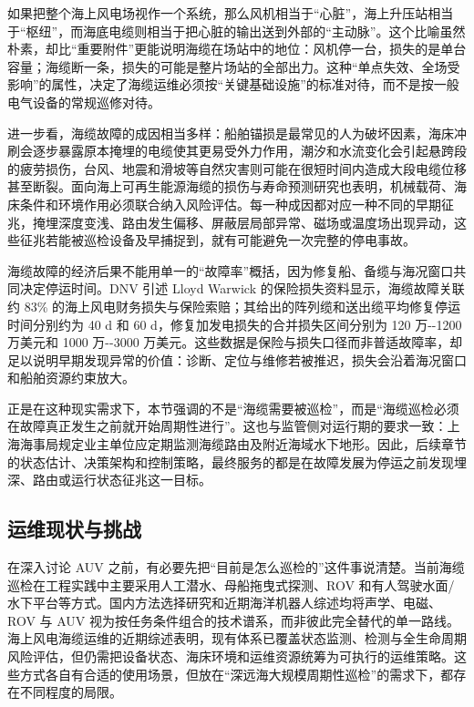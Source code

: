 如果把整个海上风电场视作一个系统，那么风机相当于``心脏''，海上升压站相当于``枢纽''，而海底电缆则相当于把心脏的输出送到外部的``主动脉''。这个比喻虽然朴素，却比``重要附件''更能说明海缆在场站中的地位：风机停一台，损失的是单台容量；海缆断一条，损失的可能是整片场站的全部出力。这种``单点失效、全场受影响''的属性，决定了海缆运维必须按``关键基础设施''的标准对待，而不是按一般电气设备的常规巡修对待。

进一步看，海缆故障的成因相当多样：船舶锚损是最常见的人为破坏因素，海床冲刷会逐步暴露原本掩埋的电缆使其更易受外力作用，潮汐和水流变化会引起悬跨段的疲劳损伤，台风、地震和滑坡等自然灾害则可能在很短时间内造成大段电缆位移甚至断裂。面向海上可再生能源海缆的损伤与寿命预测研究也表明，机械载荷、海床条件和环境作用必须联合纳入风险评估\cite{dinmohammadi2019predicting}。每一种成因都对应一种不同的早期征兆，掩埋深度变浅、路由发生偏移、屏蔽层局部异常、磁场或温度场出现异动，这些征兆若能被巡检设备及早捕捉到，就有可能避免一次完整的停电事故。

海缆故障的经济后果不能用单一的``故障率''概括，因为修复船、备缆与海况窗口共同决定停运时间。DNV 引述 Lloyd Warwick 的保险损失资料显示，海缆故障关联约 83\% 的海上风电财务损失与保险索赔；其给出的阵列缆和送出缆平均修复停运时间分别约为 40 d 和 60 d，修复加发电损失的合并损失区间分别为 120 万-\/-1200 万美元和 1000 万-\/-3000 万美元\cite{dnv2024cablefailure}。这些数据是保险与损失口径而非普适故障率，却足以说明早期发现异常的价值：诊断、定位与维修若被推迟，损失会沿着海况窗口和船舶资源约束放大。

正是在这种现实需求下，本节强调的不是``海缆需要被巡检''，而是``海缆巡检必须在故障真正发生之前就开始周期性进行''。这也与监管侧对运行期的要求一致：上海海事局规定业主单位应定期监测海缆路由及附近海域水下地形\cite{shanghai2022windtraffic}。因此，后续章节的状态估计、决策架构和控制策略，最终服务的都是在故障发展为停运之前发现埋深、路由或运行状态征兆这一目标。

\subsection{运维现状与挑战}\label{sec:ch01-1-1-3}

在深入讨论 AUV 之前，有必要先把``目前是怎么巡检的''这件事说清楚。当前海缆巡检在工程实践中主要采用人工潜水、母船拖曳式探测、ROV 和有人驾驶水面/水下平台等方式。国内方法选择研究和近期海洋机器人综述均将声学、电磁、ROV 与 AUV 视为按任务条件组合的技术谱系，而非彼此完全替代的单一路线\cite{cen2017submarine,zhang2025submarine}。海上风电海缆运维的近期综述表明，现有体系已覆盖状态监测、检测与全生命周期风险评估，但仍需把设备状态、海床环境和运维资源统筹为可执行的运维策略\cite{ning2026cableom}。这些方式各自有合适的使用场景，但放在``深远海大规模周期性巡检''的需求下，都存在不同程度的局限。

